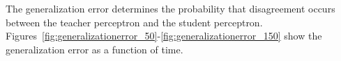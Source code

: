 The generalization error determines the probability that disagreement occurs between the teacher perceptron and the student perceptron.
Figures~\ref{fig:generalizationerror_50}-\ref{fig:generalizationerror_150} show the generalization error as a function of time.
